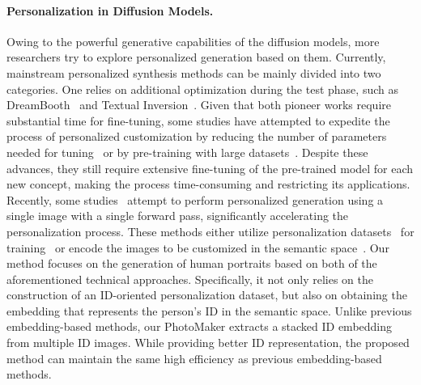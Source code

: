\paragraph{Personalization in Diffusion Models.}
Owing to the powerful generative capabilities  of the diffusion models, more researchers try to explore personalized generation based on them.
Currently, mainstream personalized synthesis methods can be mainly divided into two categories. One relies on additional optimization during the test phase, such as DreamBooth~\cite{ruiz2022dreambooth} and Textual Inversion~\cite{gal2022image}. 
Given that both pioneer works require substantial time for fine-tuning, some studies have attempted to expedite the process of personalized customization by reducing the number of parameters needed for tuning~\cite{kumari2022multi, db_lora, han2023svdiff, yuan2023inserting} or by pre-training with large datasets~\cite{gal2023designing, ruiz2023hyperdreambooth}.
 Despite these advances, they still require extensive fine-tuning of the pre-trained model for each new concept, making the process time-consuming and restricting its applications.
 Recently, some studies~\cite{wei2023elite, ma2023unified, jia2023taming, chen2023subject, shi2023instantbooth, ma2023subject, chen2023anydoor} attempt to perform personalized generation using a single image with a single forward pass, significantly accelerating the personalization process.
These methods either utilize personalization datasets~\cite{chen2023subject, sohn2023styledrop} for training~ or encode the images to be customized  in the semantic space~\cite{wei2023elite, ma2023unified, jia2023taming, 
chen2023photoverse,
shi2023instantbooth, xiao2023fastcomposer}.
Our method focuses on the generation of human portraits based on both of the aforementioned technical approaches.
Specifically,
it not only relies on the construction of an ID-oriented personalization dataset, but also on obtaining the embedding that represents the person's ID in the semantic space.
Unlike previous embedding-based methods, our PhotoMaker extracts a stacked ID embedding from multiple ID images. 
While providing better ID representation, the proposed method can maintain the same high efficiency as previous embedding-based methods.

